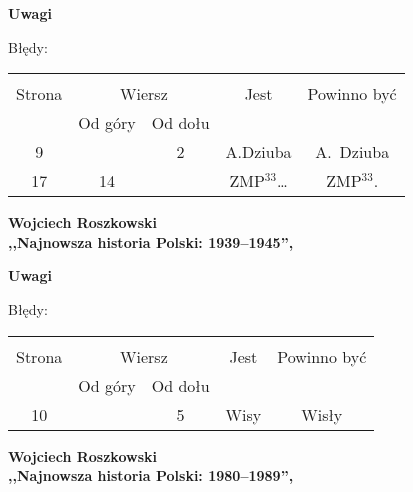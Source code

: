 \documentclass[a4paper,11pt]{article}
\newcommand{\spaceTwo}{2em}
\newcommand{\tb}{\textbf}
\newcommand{\Center}[1]{\begin{center} #1 \end{center}}
\newcommand{\CenterTB}[1]{\Center{\tb{#1}}}
\newcommand{\Work}[1]{ \begin{center} {\large \tb{#1}} \end{center} }
\begin{document}
\CenterTB{Uwagi}

Błędy:\\
\begin{center}
  \begin{tabular}{|c|c|c|c|c|}
    \hline
    & \multicolumn{2}{c|}{} & & \\
    Strona & \multicolumn{2}{c|}{Wiersz}& Jest & Powinno być \\ \cline{2-3}
    & Od góry & Od dołu &  &  \\ \hline
    9  & & 2 & A.Dziuba & A.~Dziuba \\
    17 & 14 & & ZMP$^{ 33 }$\ldots & ZMP$^{ 33 }$. \\
    \hline
  \end{tabular}
\end{center}

\vspace{\spaceTwo}



\Work{
  Wojciech Roszkowski \\
  ,,Najnowsza historia Polski: 1939--1945'',
  \cite{RoszkowskiNajnowszaHistoriaPolski39-45Wyd11} }


\CenterTB{Uwagi}

Błędy:\\
\begin{center}
  \begin{tabular}{|c|c|c|c|c|}
    \hline
    & \multicolumn{2}{c|}{} & & \\
    Strona & \multicolumn{2}{c|}{Wiersz}& Jest & Powinno być \\ \cline{2-3}
    & Od góry & Od dołu &  &  \\ \hline
    10 & & 5 & Wisy & Wisły \\
    \hline
  \end{tabular}
\end{center}

\vspace{\spaceTwo}





\Work{
  Wojciech Roszkowski \\
  ,,Najnowsza historia Polski: 1980--1989'',
  \cite{RoszkowskiNajnowszaHistoriaPolski80-89Wyd11} }
\end{document}

